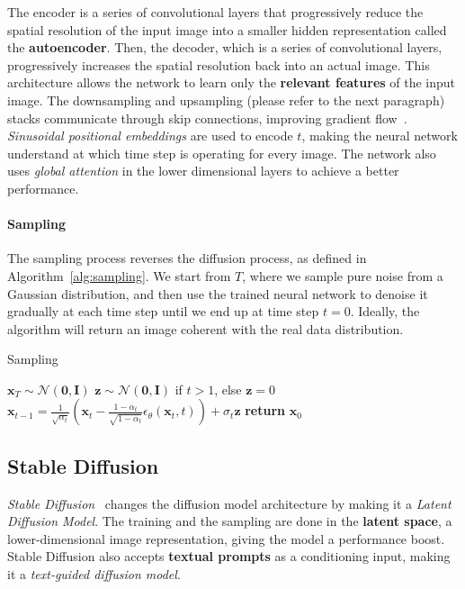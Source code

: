 \documentclass[sn-mathphys,Numbered]{sn-jnl}
\theoremstyle{thmstyleone}%
\theoremstyle{thmstyletwo}%
\theoremstyle{thmstylethree}%
\begin{document}
The encoder is a series of convolutional layers that progressively reduce the spatial resolution of the input image  into a smaller hidden representation called the \textbf{autoencoder}.
Then, the decoder, which is a series of convolutional layers, progressively increases the spatial resolution back into an actual image. This architecture allows the network to learn only the \textbf{relevant features} of the input image. The downsampling and upsampling (please refer to the next paragraph)  stacks communicate through skip connections, improving gradient flow~\cite{he2015deep}. \emph{Sinusoidal positional embeddings} are used to encode $t$,  making the neural network understand at which time step is operating for every image.
The network also uses \emph{global attention} in the lower dimensional layers to achieve a better performance.

\paragraph{Sampling}
The sampling process reverses the diffusion process, as defined in Algorithm~\ref{alg:sampling}. We start from $T$, where we sample pure noise from a Gaussian distribution, 
and then use the trained neural network to denoise it gradually at each time step until we end up at time step $t=0$.
Ideally, the algorithm will return an image coherent with the real data distribution.

\begin{algorithm}[t]
    \caption{Sampling}\label{alg:sampling}
    \begin{algorithmic}[1]
    \State $\mathbf{x}_T \sim \mathcal{N}(\mathbf{0},\mathbf{I})$
        \State $\mathbf{z} \sim \mathcal{N}(\mathbf{0}, \mathbf{I})$ if $t >1$, else $\mathbf{z} =0$
        \State $\mathbf{x}_{t-1} = \frac{1}{\sqrt{\alpha_t}}\left(\mathbf{x}_t - \frac{1-\alpha_t}{\sqrt{1-\bar{\alpha}_t}}\epsilon_\theta(\mathbf{x}_t,t)\right) + \sigma_t \mathbf{z}$
    \EndFor
    \State \textbf{return} $\mathbf{x}_0$
    \end{algorithmic}
\end{algorithm}





\subsection{Stable Diffusion}\label{sec:stable-diffusion}

\emph{Stable Diffusion}~\cite{rombach2022highresolution} changes the diffusion model architecture by making 
it a \emph{Latent Diffusion Model}. 
The training and the sampling are done in the \textbf{latent space}, 
a lower-dimensional image representation, giving the model a performance boost.
Stable Diffusion also accepts \textbf{textual prompts} as a conditioning input, making it a \emph{text-guided diffusion model}.
\end{document}
